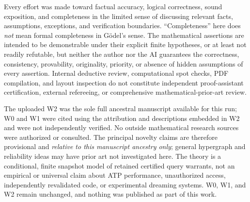 \documentclass[11pt,letterpaper]{article}
\begin{document}
\medskip\noindent Every effort was made toward factual accuracy, logical correctness, sound exposition, and completeness in the limited sense of discussing relevant facts, assumptions, exceptions, and verification boundaries. ``Completeness'' here does \emph{not} mean formal completeness in G\"odel's sense. The mathematical assertions are intended to be demonstrable under their explicit finite hypotheses, or at least not readily refutable, but neither the author nor the AI guarantees the correctness, consistency, provability, originality, priority, or absence of hidden assumptions of every assertion. Internal deductive review, computational spot checks, PDF compilation, and layout inspection do not constitute independent proof-assistant certification, external refereeing, or comprehensive mathematical-prior-art review.

\medskip\noindent The uploaded W2 was the sole full ancestral manuscript available for this run; W0 and W1 were cited using the attribution and descriptions embedded in W2 and were not independently verified. No outside mathematical research sources were authorized or consulted. The principal novelty claims are therefore provisional and \emph{relative to this manuscript ancestry only}; general hypergraph and reliability ideas may have prior art not investigated here. The theory is a conditional, finite snapshot model of retained certified query warrants, not an empirical or universal claim about ATP performance, unauthorized access, independently revalidated code, or experimental dreaming systems. W0, W1, and W2 remain unchanged, and nothing was published as part of this work.
\end{document}
